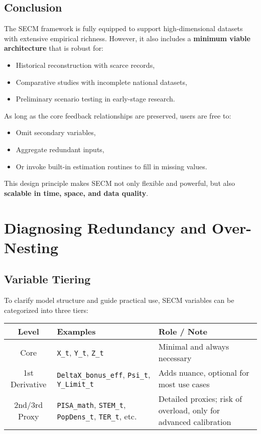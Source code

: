 \documentclass[12pt]{report}
\begin{document}
\subsection*{Conclusion}

The SECM framework is fully equipped to support high-dimensional datasets with extensive empirical richness. However, it also includes a \textbf{minimum viable architecture} that is robust for:
\begin{itemize}
  \item Historical reconstruction with scarce records,
  \item Comparative studies with incomplete national datasets,
  \item Preliminary scenario testing in early-stage research.
\end{itemize}

\noindent As long as the core feedback relationships are preserved, users are free to:
\begin{itemize}
  \item Omit secondary variables,
  \item Aggregate redundant inputs,
  \item Or invoke built-in estimation routines to fill in missing values.
\end{itemize}

This design principle makes SECM not only flexible and powerful, but also \textbf{ scalable in time, space, and data quality}.

\section{Diagnosing Redundancy and Over-Nesting}

\subsection{Variable Tiering}

To clarify model structure and guide practical use, SECM variables can be categorized into three tiers:

\begin{table}[htbp]  %
\centering
\small  %
\begin{tabular}{|c|l|p{6.5cm}|}  %
\hline
\textbf{Level} & \textbf{Examples} & \textbf{Role / Note} \\
\hline
Core & \texttt{X\_t}, \texttt{Y\_t}, \texttt{Z\_t} & Minimal and always necessary \\
1st Derivative & \texttt{DeltaX\_bonus\_eff}, \texttt{Psi\_t}, \texttt{Y\_Limit\_t} & Adds nuance, optional for most use cases \\
2nd/3rd Proxy & \texttt{PISA\_math}, \texttt{STEM\_t}, \texttt{PopDens\_t}, \texttt{TER\_t}, etc. & Detailed proxies; risk of overload, only for advanced calibration \\
\hline
\end{tabular}
\end{table}
\end{document}
